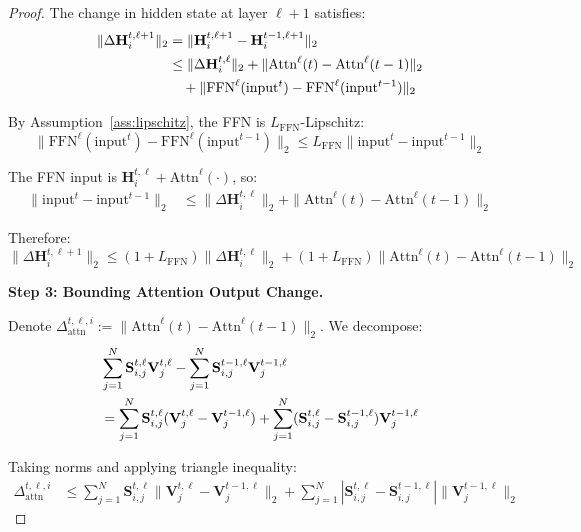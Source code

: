 \documentclass{article} %
\theoremstyle{definition}
\theoremstyle{remark}
\begin{document}
\begin{proof}
The change in hidden state at layer $\ell+1$ satisfies:
\begin{align}
\|\Delta\mathbf{H}^{t,\ell+1}_i\|_2 &= \|\mathbf{H}^{t,\ell+1}_i - \mathbf{H}^{t-1,\ell+1}_i\|_2\notag\\
&\leq \|\Delta\mathbf{H}^{t,\ell}_i\|_2 + \|\text{Attn}^{\ell}(t) - \text{Attn}^{\ell}(t-1)\|_2 \notag\\
&\quad + \|\text{FFN}^{\ell}(\text{input}^t) - \text{FFN}^{\ell}(\text{input}^{t-1})\|_2
\end{align}

By Assumption~\ref{ass:lipschitz}, the FFN is $L_{\text{FFN}}$-Lipschitz:
\begin{equation}
\|\text{FFN}^{\ell}(\text{input}^t) - \text{FFN}^{\ell}(\text{input}^{t-1})\|_2 \leq L_{\text{FFN}} \|\text{input}^t - \text{input}^{t-1}\|_2
\end{equation}

The FFN input is $\mathbf{H}^{t,\ell}_i + \text{Attn}^{\ell}(\cdot)$, so:
\begin{align}
\|\text{input}^t - \text{input}^{t-1}\|_2 &\leq \|\Delta\mathbf{H}^{t,\ell}_i\|_2 + \|\text{Attn}^{\ell}(t) - \text{Attn}^{\ell}(t-1)\|_2
\end{align}

Therefore:
\begin{equation}\label{eq:hidden-recursion}
\|\Delta\mathbf{H}^{t,\ell+1}_i\|_2 \leq (1 + L_{\text{FFN}})\|\Delta\mathbf{H}^{t,\ell}_i\|_2 + (1 + L_{\text{FFN}})\|\text{Attn}^{\ell}(t) - \text{Attn}^{\ell}(t-1)\|_2
\end{equation}

\textbf{Step 3: Bounding Attention Output Change.}

Denote $\Delta_{\text{attn}}^{t,\ell,i} := \|\text{Attn}^{\ell}(t) - \text{Attn}^{\ell}(t-1)\|_2$. We decompose:
\begin{align}
&\sum_{j=1}^N \mathbf{S}^{t,\ell}_{i,j} \mathbf{V}^{t,\ell}_j - \sum_{j=1}^N \mathbf{S}^{t-1,\ell}_{i,j} \mathbf{V}^{t-1,\ell}_j \notag\\
&= \sum_{j=1}^N \mathbf{S}^{t,\ell}_{i,j} (\mathbf{V}^{t,\ell}_j - \mathbf{V}^{t-1,\ell}_j) + \sum_{j=1}^N (\mathbf{S}^{t,\ell}_{i,j} - \mathbf{S}^{t-1,\ell}_{i,j}) \mathbf{V}^{t-1,\ell}_j
\end{align}

Taking norms and applying triangle inequality:
\begin{align}
\Delta_{\text{attn}}^{t,\ell,i} &\leq \sum_{j=1}^N \mathbf{S}^{t,\ell}_{i,j} \|\mathbf{V}^{t,\ell}_j - \mathbf{V}^{t-1,\ell}_j\|_2 + \sum_{j=1}^N |\mathbf{S}^{t,\ell}_{i,j} - \mathbf{S}^{t-1,\ell}_{i,j}| \|\mathbf{V}^{t-1,\ell}_j\|_2
\end{align}


\end{proof}
\end{document}
